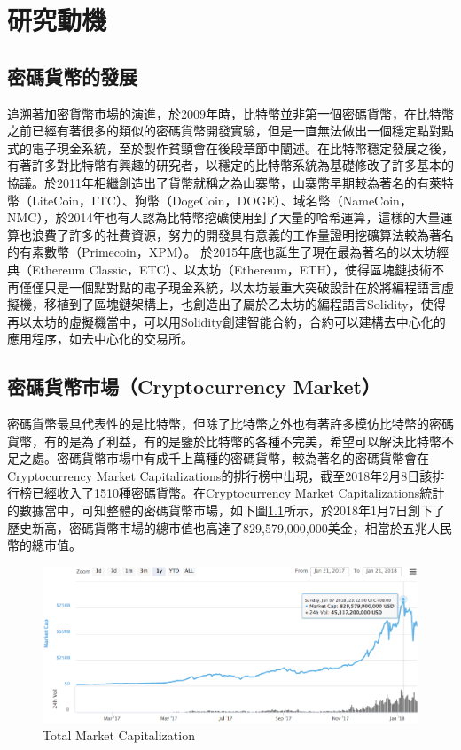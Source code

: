 
\chapter{研究動機}
	\section{密碼貨幣的發展}
	追溯著加密貨幣市場的演進，於2009年時，比特幣並非第一個密碼貨幣，在比特幣之前已經有著很多的類似的密碼貨幣開發實驗，但是一直無法做出一個穩定點對點式的電子現金系統，至於製作貧頸會在後段章節中闡述。在比特幣穩定發展之後，有著許多對比特幣有興趣的研究者，以穩定的比特幣系統為基礎修改了許多基本的協議。於2011年相繼創造出了貨幣就稱之為山寨幣，山寨幣早期較為著名的有萊特幣（LiteCoin，LTC）\parencite{litecoin}、狗幣（DogeCoin，DOGE）\parencite{dogecoin}、域名幣（NameCoin，NMC）\parencite{namecoin}，於2014年也有人認為比特幣挖礦使用到了大量的哈希運算，這樣的大量運算也浪費了許多的社費資源，努力的開發具有意義的工作量證明挖礦算法較為著名的有素數幣（Primecoin，XPM）\parencite{primecoin}。 於2015年底也誕生了現在最為著名的以太坊經典（Ethereum Classic，ETC）\parencite{ethereumclassic}、以太坊（Ethereum，ETH）\parencite{ethereum}，使得區塊鏈技術不再僅僅只是一個點對點的電子現金系統，以太坊最重大突破設計在於將編程語言虛擬機，移植到了區塊鏈架構上，也創造出了屬於乙太坊的編程語言Solidity，使得再以太坊的虛擬機當中，可以用Solidity創建智能合約，合約可以建構去中心化的應用程序，如去中心化的交易所。

	\section{密碼貨幣市場（Cryptocurrency Market）}
	密碼貨幣最具代表性的是比特幣，但除了比特幣之外也有著許多模仿比特幣的密碼貨幣，有的是為了利益，有的是鑒於比特幣的各種不完美，希望可以解決比特幣不足之處。密碼貨幣市場中有成千上萬種的密碼貨幣，較為著名的密碼貨幣會在Cryptocurrency Market Capitalizations\parencite{CryptocurrencyMarketCapitalizations}的排行榜中出現，截至2018年2月8日該排行榜已經收入了1510種密碼貨幣。在Cryptocurrency Market Capitalizations統計的數據當中，可知整體的密碼貨幣市場，如下圖\ref{TotalMarketCapitalization}所示，於2018年1月7日創下了歷史新高，密碼貨幣市場的總市值也高達了829,579,000,000美金，相當於五兆人民幣的總市值。

		\begin{figure}[htbp]
			\centering
			\includegraphics[width = .9\textwidth]{TotalMarketCapitalization.png}
			\caption{Total Market Capitalization\parencite{TotalMarketCapitalization}}\label{TotalMarketCapitalization}
		\end{figure}

